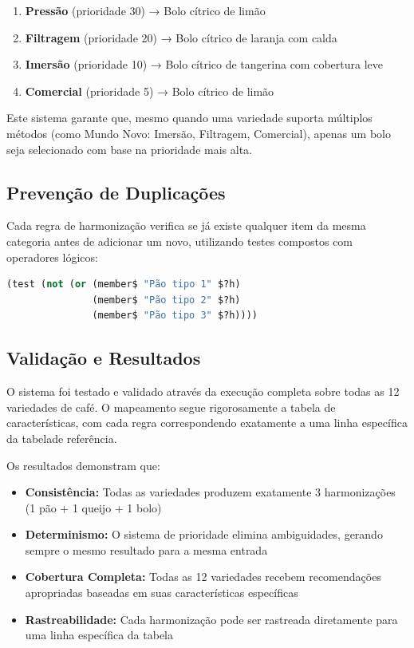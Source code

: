\documentclass[a4paper,12pt]{article}
\begin{document}
\begin{enumerate}
  \item \textbf{Pressão} (prioridade 30) → Bolo cítrico de limão
  \item \textbf{Filtragem} (prioridade 20) → Bolo cítrico de laranja com calda  
  \item \textbf{Imersão} (prioridade 10) → Bolo cítrico de tangerina com cobertura leve
  \item \textbf{Comercial} (prioridade 5) → Bolo cítrico de limão
\end{enumerate}

Este sistema garante que, mesmo quando uma variedade suporta múltiplos métodos (como Mundo Novo: Imersão, Filtragem, Comercial), apenas um bolo seja selecionado com base na prioridade mais alta.

\subsection{Prevenção de Duplicações}
Cada regra de harmonização verifica se já existe qualquer item da mesma categoria antes de adicionar um novo, utilizando testes compostos com operadores lógicos:
\begin{lstlisting}[language=Lisp]
(test (not (or (member$ "Pão tipo 1" $?h)
               (member$ "Pão tipo 2" $?h)
               (member$ "Pão tipo 3" $?h))))
\end{lstlisting}

\subsection{Validação e Resultados}
O sistema foi testado e validado através da execução completa sobre todas as 12 variedades de café. O mapeamento segue rigorosamente a tabela de características, com cada regra correspondendo exatamente a uma linha específica da tabelade referência.

Os resultados demonstram que:
\begin{itemize}
  \item \textbf{Consistência:} Todas as variedades produzem exatamente 3 harmonizações (1 pão + 1 queijo + 1 bolo)
  \item \textbf{Determinismo:} O sistema de prioridade elimina ambiguidades, gerando sempre o mesmo resultado para a mesma entrada
  \item \textbf{Cobertura Completa:} Todas as 12 variedades recebem recomendações apropriadas baseadas em suas características específicas
  \item \textbf{Rastreabilidade:} Cada harmonização pode ser rastreada diretamente para uma linha específica da tabela
\end{itemize}
\end{document}
